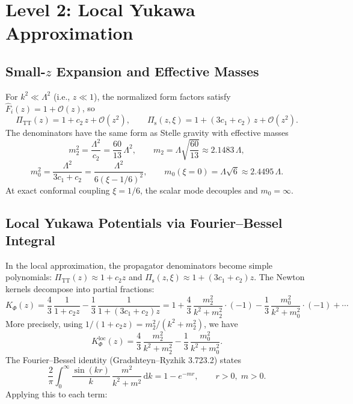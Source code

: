 \documentclass[11pt,a4paper]{article}
\newcommand{\dd}{\mathrm{d}}
\newcommand{\PiTT}{\Pi_{\mathrm{TT}}}
\newcommand{\Pis}{\Pi_{\mathrm{s}}}
\newcommand{\KPhi}{K_\Phi}
\newcommand{\Fhat}{\hat{F}}
\newcommand{\order}{\mathcal{O}}
\begin{document}
\section{Level 2: Local Yukawa Approximation}
\label{sec:level2}

\subsection{Small-\texorpdfstring{$z$}{z} Expansion and Effective Masses}
\label{sec:masses}

For $k^2 \ll \Lambda^2$ (i.e., $z \ll 1$), the normalized form factors
satisfy $\Fhat_i(z) = 1 + \order(z)$, so
\begin{equation}
  \PiTT(z) = 1 + c_2\,z + \order(z^2),
  \qquad
  \Pis(z,\xi) = 1 + (3c_1+c_2)\,z + \order(z^2).
\end{equation}
The denominators have the same form as Stelle gravity with effective masses
\begin{equation}\label{eq:m2}
  m_2^2 = \frac{\Lambda^2}{c_2}
  = \frac{60}{13}\,\Lambda^2,
  \qquad
  m_2 = \Lambda\sqrt{\frac{60}{13}} \approx 2.1483\,\Lambda,
\end{equation}
\begin{equation}\label{eq:m0}
  m_0^2 = \frac{\Lambda^2}{3c_1+c_2}
  = \frac{\Lambda^2}{6(\xi-1/6)^2},
  \qquad
  m_0(\xi=0) = \Lambda\sqrt{6} \approx 2.4495\,\Lambda.
\end{equation}
At exact conformal coupling $\xi = 1/6$, the scalar mode decouples and
$m_0 = \infty$.

\subsection{Local Yukawa Potentials via Fourier--Bessel Integral}
\label{sec:yukawa-potentials}

In the local approximation, the propagator denominators become simple
polynomials: $\PiTT(z) \approx 1 + c_2 z$ and
$\Pis(z,\xi) \approx 1 + (3c_1+c_2)z$.  The Newton kernels decompose
into partial fractions:
\begin{equation}
  \KPhi(z) = \frac{4}{3}\,\frac{1}{1+c_2 z} - \frac{1}{3}\,\frac{1}{1+(3c_1+c_2)z}
  = 1 + \frac{4}{3}\,\frac{m_2^2}{k^2+m_2^2}\cdot(-1)
  - \frac{1}{3}\,\frac{m_0^2}{k^2+m_0^2}\cdot(-1) + \cdots
\end{equation}
More precisely, using $1/(1+c_2 z) = m_2^2/(k^2+m_2^2)$, we have
\begin{equation}
  \KPhi^{\mathrm{loc}}(z)
  = \frac{4}{3}\,\frac{m_2^2}{k^2+m_2^2}
  - \frac{1}{3}\,\frac{m_0^2}{k^2+m_0^2}.
\end{equation}
The Fourier--Bessel identity (Gradshteyn--Ryzhik 3.723.2) states
\begin{equation}\label{eq:GR-identity}
  \frac{2}{\pi}\int_0^\infty \frac{\sin(kr)}{k}\,\frac{m^2}{k^2+m^2}\,\dd k
  = 1 - e^{-mr},
  \qquad r > 0,\; m > 0.
\end{equation}
Applying this to each term:
\end{document}

